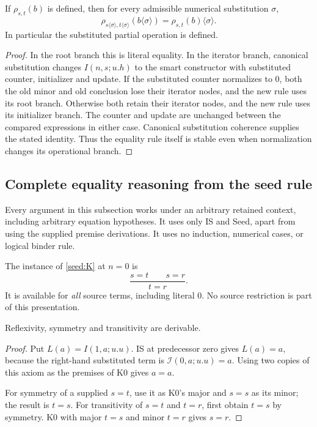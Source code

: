 \begin{lemma}
\label{seed:substitution}
If $\rho_{s,t}(b)$ is defined, then for every admissible numerical
substitution $\sigma$,
\[
 \rho_{s\langle\sigma\rangle,t\langle\sigma\rangle}
       (b\langle\sigma\rangle)
 =\rho_{s,t}(b)\langle\sigma\rangle.
\]
In particular the substituted partial operation is defined.
\end{lemma}
\begin{proof}
In the root branch this is literal equality. In the iterator branch,
canonical substitution changes $I(n,s;u.h)$ to the smart constructor
with substituted counter, initializer and update. If the substituted
counter normalizes to $0$, both the old minor and old conclusion lose
their iterator nodes, and the new rule uses its root branch. Otherwise
both retain their iterator nodes, and the new rule uses its initializer
branch. The counter and update are unchanged between the compared
expressions in either case. Canonical substitution coherence supplies
the stated identity. Thus the equality rule itself is stable even when
normalization changes its operational branch.
\end{proof}

\subsection{Complete equality reasoning from the seed rule}

Every argument in this subsection works under an arbitrary retained
context, including arbitrary equation hypotheses. It uses only IS and
Seed, apart from using the supplied premise derivations. It uses no
induction, numerical cases, or logical binder rule.

The instance of \eqref{seed:K} at $n=0$ is
\[
 \frac{s=t\qquad s=r}{t=r}.
 \tag{K0}\label{seed:K0}
\]
It is available for \emph{all} source terms, including literal $0$.
No source restriction is part of this presentation.

\begin{lemma}\label{seed:algebra}
Reflexivity, symmetry and transitivity are derivable.
\end{lemma}
\begin{proof}
Put $L(a)=I(1,a;u.u)$. IS at predecessor zero gives $L(a)=a$,
because the right-hand substituted term is $\mathcal I(0,a;u.u)=a$.
Using two copies of this axiom as the premises of K0 gives $a=a$.

For symmetry of a supplied $s=t$, use it as K0's major and $s=s$
as its minor; the result is $t=s$. For transitivity of $s=t$ and
$t=r$, first obtain $t=s$ by symmetry. K0 with major $t=s$ and
minor $t=r$ gives $s=r$.
\end{proof}

